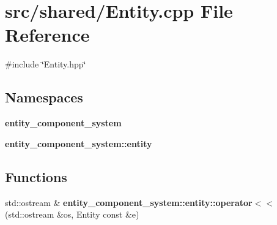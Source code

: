 \section{src/shared/\+Entity.cpp File Reference}
\label{_entity_8cpp}
{\ttfamily \#include \char`\"{}Entity.\+hpp\char`\"{}}\newline
\subsection*{Namespaces}
\begin{DoxyCompactItemize}
\item 
 {\bf entity\+\_\+component\+\_\+system}
\item 
 {\bf entity\+\_\+component\+\_\+system\+::entity}
\end{DoxyCompactItemize}
\subsection*{Functions}
\begin{DoxyCompactItemize}
\item 
std\+::ostream \& {\bf entity\+\_\+component\+\_\+system\+::entity\+::operator$<$$<$} (std\+::ostream \&os, Entity const \&e)
\end{DoxyCompactItemize}
